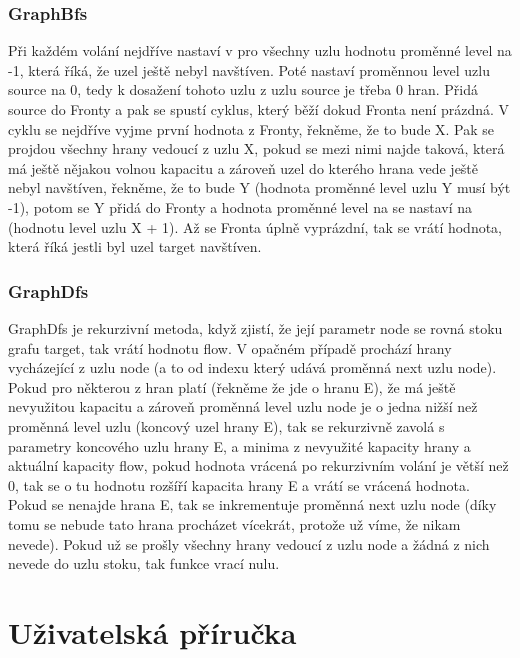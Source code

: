 \documentclass[12pt,a4paper]{article}
\begin{document}
	 \subsubsection{GraphBfs}
	  Při každém volání nejdříve nastaví v pro všechny uzlu hodnotu proměnné level na -1, která říká, že uzel ještě nebyl navštíven. Poté nastaví proměnnou level uzlu source na 0, tedy k dosažení tohoto uzlu z uzlu source je třeba 0 hran. Přidá source do Fronty a pak se spustí cyklus, který běží dokud Fronta není prázdná. V cyklu se nejdříve vyjme první hodnota z Fronty, řekněme, že to bude X. Pak se projdou všechny hrany vedoucí z uzlu X, pokud se mezi nimi najde taková, která má ještě nějakou volnou kapacitu a zároveň uzel do kterého hrana vede ještě nebyl navštíven, řekněme, že to bude Y (hodnota proměnné level uzlu Y musí být -1), potom se Y přidá do Fronty a hodnota proměnné level na se nastaví na (hodnotu level uzlu X + 1). Až se Fronta úplně vyprázdní, tak se vrátí hodnota, která říká jestli byl uzel target navštíven. 
	  \subsubsection{GraphDfs}
	   GraphDfs je rekurzivní metoda, když zjistí, že její parametr node se rovná stoku grafu target, tak vrátí hodnotu flow. V opačném případě prochází hrany vycházející z uzlu node (a to od indexu který udává proměnná next uzlu node). Pokud pro některou z hran platí (řekněme že jde o hranu E), že má ještě nevyužitou kapacitu a zároveň proměnná level uzlu node je o jedna nižší než proměnná level uzlu (koncový uzel hrany E), tak se rekurzivně zavolá s parametry koncového uzlu hrany E, a minima z nevyužité kapacity hrany a aktuální kapacity flow, pokud  hodnota vrácená po rekurzivním volání je větší než 0, tak se o tu hodnotu rozšíří kapacita hrany E a vrátí se vrácená hodnota. Pokud se nenajde hrana E, tak se inkrementuje proměnná next uzlu node (díky tomu se nebude tato hrana procházet vícekrát, protože už víme, že nikam nevede). Pokud už se prošly všechny hrany vedoucí z uzlu node a žádná z nich nevede do uzlu stoku, tak funkce vrací nulu.
	 \section{Uživatelská příručka}
\end{document}
